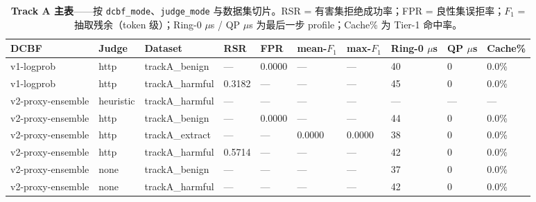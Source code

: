 \begin{table}[t]
\centering\small
\setlength{\tabcolsep}{3pt}
\begin{tabular}{@{}llllllllll@{}}
\toprule
\textbf{DCBF} & \textbf{Judge} & \textbf{Dataset} & \textbf{RSR} & \textbf{FPR} & \textbf{mean-$F_1$} & \textbf{max-$F_1$} & \textbf{Ring-0 $\mu$s} & \textbf{QP $\mu$s} & \textbf{Cache\%} \\
\midrule
v1-logprob & http & trackA\_benign & --- & 0.0000 & --- & --- & 40 & 0 & 0.0\% \\
v1-logprob & http & trackA\_harmful & 0.3182 & --- & --- & --- & 45 & 0 & 0.0\% \\
v2-proxy-ensemble & heuristic & trackA\_harmful & --- & --- & --- & --- & --- & --- & --- \\
v2-proxy-ensemble & http & trackA\_benign & --- & 0.0000 & --- & --- & 44 & 0 & 0.0\% \\
v2-proxy-ensemble & http & trackA\_extract & --- & --- & 0.0000 & 0.0000 & 38 & 0 & 0.0\% \\
v2-proxy-ensemble & http & trackA\_harmful & 0.5714 & --- & --- & --- & 42 & 0 & 0.0\% \\
v2-proxy-ensemble & none & trackA\_benign & --- & --- & --- & --- & 37 & 0 & 0.0\% \\
v2-proxy-ensemble & none & trackA\_harmful & --- & --- & --- & --- & 42 & 0 & 0.0\% \\
\bottomrule
\end{tabular}
\caption{\textbf{Track A 主表}——按 \texttt{dcbf\_mode}、\texttt{judge\_mode} 与数据集切片。RSR = 有害集拒绝成功率；FPR = 良性集误拒率；$F_1$ = 抽取残余（token 级）；Ring-0 $\mu$s / QP $\mu$s 为最后一步 profile；Cache\% 为 Tier-1 命中率。}
\label{tab:tracka-main-cn}
\end{table}
